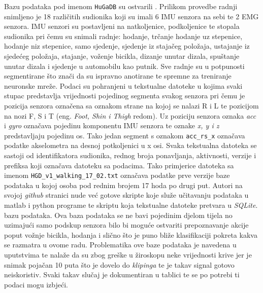 \documentclass[times, utf8, diplomski]{fer}
\begin{document}
Bazu podataka pod imenom \texttt{HuGaDB} su ostvarili \cite{HuGaDB}. Prilikom provedbe radnji snimljeno je 18 različitih sudionika
koji su imali 6 IMU senzora na sebi te 2 EMG senzora. IMU senzori su postavljeni na natkoljenice, podkoljenice te stopala sudionika
pri čemu su snimali radnje: hodanje, trčanje hodanje uz stepenice, hodanje niz stepenice, samo sjedenje, sjedenje iz stajačeg položaja,
ustajanje iz sjedećeg položaja, stajanje, voženje bicikla, dizanje unutar dizala, spuštanje unutar dizala i sjedenje
u automobilu kao putnik. Sve radnje su u potpunosti segmentirane što znači da su ispravno anotirane te spremne za treniranje
neuronske mreže. Podaci su pohranjeni u tekstualne datoteke u kojima svaki stupac predstavlja vrijednosti pojedinog segmenta
svakog senzora pri čemu je pozicija senzora označena sa oznakom strane na kojoj se nalazi R i L te pozicijom na nozi F, S i T
(eng. \textit{Foot, Shin i Thigh} redom). Uz poziciju senzora oznaka \textit{acc} i \textit{gyro} označava pojedinu komponentu
IMU senzora te oznake \textit{x, y i z} predstavljaju pojedinu os. Tako jedan segment s oznakom \texttt{acc\_rs\_x} označava
podatke akselometra na desnoj potkoljenici u x osi. Svaka tekstualna datoteka se sastoji od identifikatora sudionika,
rednog broja ponavljanja, aktivnosti, verzije i prefiksa koji označava datoteku sa podacima. Tako primjerice datoteka sa imenom
\texttt{HGD\_v1\_walking\_17\_02.txt} označava podatke prve verzije baze podataka u kojoj osoba pod rednim brojem 17 hoda po
drugi put. Autori \cite{HuGaDB} na svojoj \textit{github} stranici nude već gotove skripte koje služe učitavanju podataka u
matlab i python programe te skriptu koja tekstualne datoteke pretvara u \textit{SQLite}. bazu podataka.
Ova baza podataka se ne bavi pojedinim djelom tijela no uzimajući samo podskup 
senzora bilo bi moguće ostvariti prepoznavanje akcije poput vožnje bicikla, hodanja i slično što je puno bliže klasifikaciji pokreta
kakva se razmatra u ovome radu. Problematika ove baze podataka je navedena u uputstvima te nalaže da su zbog greške u žiroskopu
neke vrijednosti krive jer je snimak pojačan 10 puta što je dovelo do \textit{klipinga} te je takav signal gotovo neiskoristiv.
Svaki takav slučaj je dokumentiran u tablici te se po potrebi ti podaci mogu izbjeći.
\end{document}
